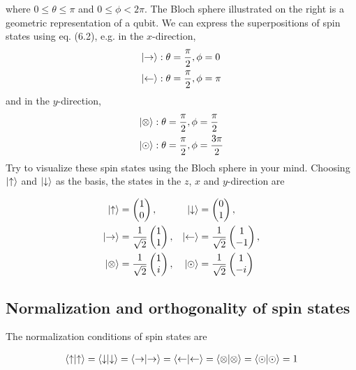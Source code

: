 \documentclass[12pt]{book} %
\numberwithin{equation}{chapter}
\begin{document}
\noindent where $0\leq\theta\leq\pi$ and $0\leq\phi<2\pi$. The Bloch sphere illustrated on the right is a geometric representation of a qubit.\bigskip\newline
We can express the superpositions of spin states using eq. (6.2), e.g. in the $x$-direction,
\begin{align*}
\ket{\rightarrow}&: \theta=\frac{\pi}{2}, \phi=0\\
\ket{\leftarrow}&: \theta=\frac{\pi}{2}, \phi=\pi
\end{align*}
and in the $y$-direction,
\begin{align*}
\ket{\otimes}&: \theta=\frac{\pi}{2}, \phi=\frac{\pi}{2}\\
\ket{\odot}&: \theta=\frac{\pi}{2}, \phi=\frac{3\pi}{2}
\end{align*}
Try to visualize these spin states using the Bloch sphere in your mind.\bigskip\newline
Choosing $\ket{\uparrow}$ and $\ket{\downarrow}$ as the basis, the states in the $z$, $x$ and $y$-direction are
\begin{eqnbox}
\begin{align}
\ket{\uparrow}&=
\begin{pmatrix}
1\\
0
\end{pmatrix}, &
\ket{\downarrow}&=
\begin{pmatrix}
0\\
1
\end{pmatrix},\nonumber\\
\ket{\rightarrow}&=\frac{1}{\sqrt{2}}
\begin{pmatrix}
1\\
1
\end{pmatrix}, &
\ket{\leftarrow}&=\frac{1}{\sqrt{2}}
\begin{pmatrix}
1\\
-1
\end{pmatrix},\nonumber\\
\ket{\otimes}&=\frac{1}{\sqrt{2}}
\begin{pmatrix}
1\\
i
\end{pmatrix}, &
\ket{\odot}&=\frac{1}{\sqrt{2}}
\begin{pmatrix}
1\\
-i
\end{pmatrix}
\end{align}
\end{eqnbox}

\subsection*{Normalization and orthogonality of spin states}
The normalization conditions of spin states are
\begin{eqnbox}
\begin{align}
\braket{\uparrow}=\braket{\downarrow}=\braket{\rightarrow}=\braket{\leftarrow}=\braket{\otimes}=\braket{\odot}=1
\end{align}
\end{eqnbox}
\end{document}
